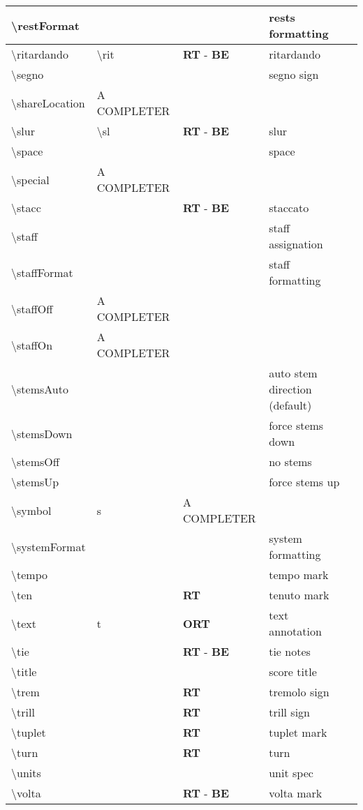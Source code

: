 \documentclass[a4paper, landscape, 11pt]{article}
\begin{document}
\begin{tabularx}{\linewidth}{lllll}
    \hline
    \textbackslash{}restFormat&&&rests formatting&\\
    \hline
    \textbackslash{}ritardando&\textbackslash{}rit&\textbf{RT} - \textbf{BE}&ritardando&\\
    \hline
    \textbackslash{}segno&&&segno sign&\\
    \hline
    \textbackslash{}shareLocation&A COMPLETER&&&\\
    \hline
    \textbackslash{}slur&\textbackslash{}sl&\textbf{RT} - \textbf{BE}&slur&\\
    \hline
    \textbackslash{}space&&&space&\\
    \hline
    \textbackslash{}special&A COMPLETER&&&\\
    \hline
    \textbackslash{}stacc&&\textbf{RT} - \textbf{BE}&staccato&\\
    \hline
    \textbackslash{}staff&&&staff assignation&\\
    \hline
    \textbackslash{}staffFormat&&&staff formatting&\\
    \hline
    \textbackslash{}staffOff&A COMPLETER&&&\\
    \hline
    \textbackslash{}staffOn&A COMPLETER&&&\\
    \hline
    \textbackslash{}stemsAuto&&&auto stem direction (default)&\\
    \hline
    \textbackslash{}stemsDown&&&force stems down&\\
    \hline
    \textbackslash{}stemsOff&&&no stems&\\
    \hline
    \textbackslash{}stemsUp&&&force stems up&\\
    \hline
    \textbackslash{}symbol&s&A COMPLETER&&\\
    \hline
    \textbackslash{}systemFormat&&&system formatting&\\
    \hline
    \textbackslash{}tempo&&&tempo mark&\\
    \hline
    \textbackslash{}ten&&\textbf{RT}&tenuto mark&\\
    \hline
    \textbackslash{}text&t&\textbf{ORT}&text annotation&\\
    \hline
    \textbackslash{}tie&&\textbf{RT} - \textbf{BE}&tie notes&\\
    \hline
    \textbackslash{}title&&&score title&\\
    \hline
    \textbackslash{}trem&&\textbf{RT}&tremolo sign&\\
    \hline
    \textbackslash{}trill&&\textbf{RT}&trill sign&\\
    \hline
    \textbackslash{}tuplet&&\textbf{RT}&tuplet mark&\\
    \hline
    \textbackslash{}turn&&\textbf{RT}&turn&\\
    \hline
    \textbackslash{}units&&&unit spec&\\
    \hline
    \textbackslash{}volta&&\textbf{RT} - \textbf{BE}&volta mark&\\
    \hline
\end{tabularx}
\end{document}

